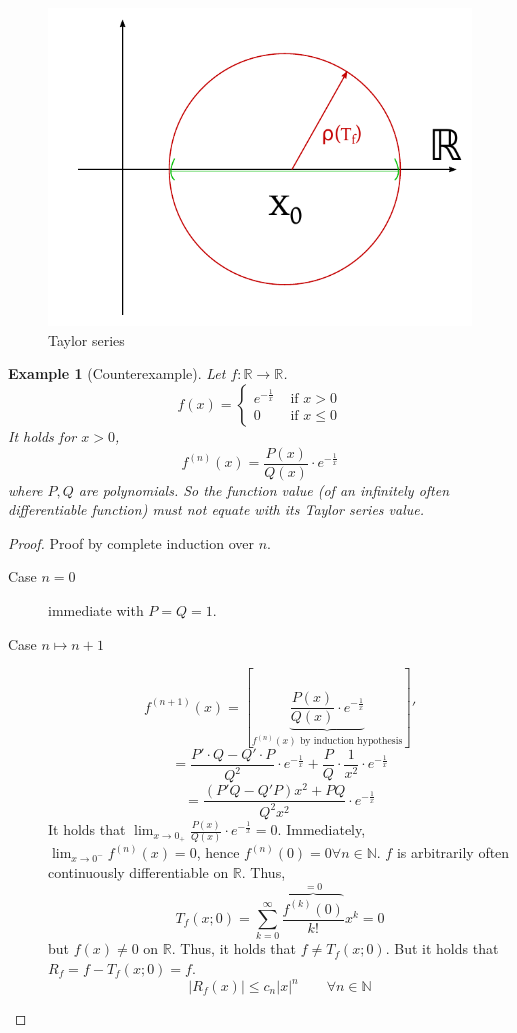 \documentclass{article}
\newtheorem{example}{Example}  \numberwithin{example}{section}
\newcommand{\card}[1]{\left|#1\right|}
\begin{document}
\begin{figure}[t]
  \begin{center}
    \includegraphics{img/28_Taylor_series.pdf}
    \caption{Taylor series}
    \label{img:tay}
  \end{center}
\end{figure}

\begin{example}[Counterexample]
  Let $f: \mathbb R \to \mathbb R$.
  \[ f(x) = \begin{cases} e^{-\frac1x} & \text{ if } x > 0 \\ 0 & \text{ if } x \leq 0 \end{cases} \]
  It holds for $x > 0$,
  \[ f^{(n)}(x) = \frac{P(x)}{Q(x)} \cdot e^{-\frac1x} \]
  where $P, Q$ are polynomials.
  So the function value (of an infinitely often differentiable function) must not equate with its Taylor series value.
\end{example}

\begin{proof}
  Proof by complete induction over $n$.

  \begin{description}
    \item[Case $n=0$] immediate with $P = Q = 1$.
    \item[Case $n\mapsto n+1$]
      \[ f^{(n+1)}(x) = \left[\underbrace{\frac{P(x)}{Q(x)} \cdot e^{-\frac1x}}_{f^{(n)}(x) \text{ by induction hypothesis}}\right]' \]
      \[ = \frac{P' \cdot Q - Q' \cdot P}{Q^2} \cdot e^{-\frac1x} + \frac PQ \cdot \frac1{x^2} \cdot e^{-\frac1x} \]
      \[ = \frac{(P' Q - Q' P) x^2 + PQ}{Q^2 x^2} \cdot e^{-\frac1x} \]
      It holds that $\lim_{x\to0_+} \frac{P(x)}{Q(x)} \cdot e^{-\frac1x} = 0$.
      Immediately, $\lim_{x \to 0^-} f^{(n)}(x) = 0$, hence $f^{(n)}(0) = 0 \forall n \in \mathbb N$.
      $f$ is arbitrarily often continuously differentiable on $\mathbb R$. Thus,
      \[ T_f(x; 0) = \sum_{k=0}^\infty \frac{\overbrace{f^{(k)}(0)}^{=0}}{k!} x^k = 0 \]
      but $f(x) \neq 0$ on $\mathbb R$. Thus, it holds that $f \neq T_f(x; 0)$.
      But it holds that $R_f = f - T_f(x; 0) = f$.
      \[ \card{R_f(x)} \leq c_n \card{x}^n \qquad \forall n \in \mathbb N \]
  \end{description}
\end{proof}
\end{document}
